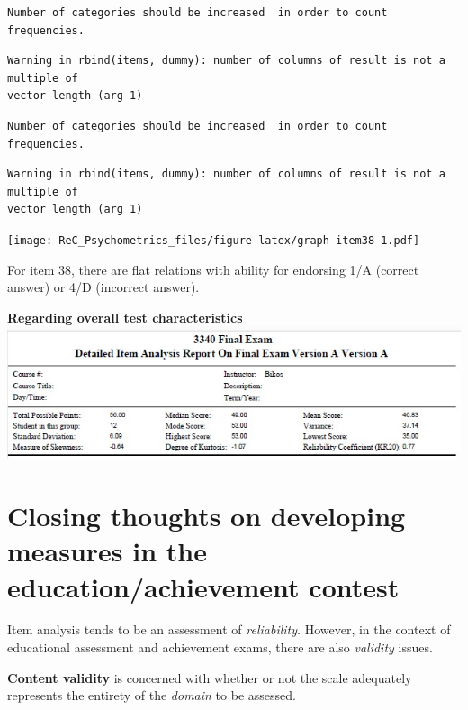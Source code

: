 \documentclass[
  english,
]{book}
\begin{document}
\begin{verbatim}
Number of categories should be increased  in order to count frequencies. 
\end{verbatim}

\begin{verbatim}
Warning in rbind(items, dummy): number of columns of result is not a multiple of
vector length (arg 1)
\end{verbatim}

\begin{verbatim}
Number of categories should be increased  in order to count frequencies. 
\end{verbatim}

\begin{verbatim}
Warning in rbind(items, dummy): number of columns of result is not a multiple of
vector length (arg 1)
\end{verbatim}

\texttt{[image: ReC\_Psychometrics\_files/figure-latex/graph item38-1.pdf]}

For item 38, there are flat relations with ability for endorsing 1/A (correct answer) or 4/D (incorrect answer).

\textbf{Regarding overall test characteristics}
\includegraphics{images/ItemAnalExam/examheader.jpg}

\hypertarget{closing-thoughts-on-developing-measures-in-the-educationachievement-contest}{%
\section{Closing thoughts on developing measures in the education/achievement contest}\label{closing-thoughts-on-developing-measures-in-the-educationachievement-contest}}

Item analysis tends to be an assessment of \emph{reliability}. However, in the context of educational assessment and achievement exams, there are also \emph{validity} issues.

\textbf{Content validity} is concerned with whether or not the scale adequately represents the entirety of the \emph{domain} to be assessed.
\end{document}
